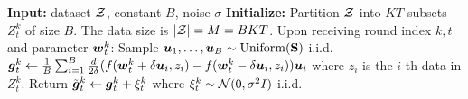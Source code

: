 \begin{algorithm}[t]
\caption{Naive private gradient oracle}
\label{alg:DP-O2NC:oracle-standard}
\begin{algorithmic}[1]
    \Statex \textbf{Input:} dataset ${\cal Z}$, constant $B$, noise $\sigma$
    \Statex \textbf{Initialize:} Partition ${\cal Z}$ into $KT$ subsets $Z_t^k$ of size $B$. The data size is $|{\cal Z}|=M=BKT$.
    \State Upon receiving round index $k,t$ and parameter ${\boldsymbol{w}}_t^k$:
    \State Sample ${\boldsymbol{u}}_1,\ldots,{\boldsymbol{u}}_B\sim\mathrm{Uniform}({\mathbf{S}})$ i.i.d.
    \State ${\boldsymbol{g}}_t^k \gets \frac{1}{B}\sum_{i=1}^B \frac{d}{2\delta}(f({\boldsymbol{w}}_t^k+\delta{\boldsymbol{u}}_i,z_i) - f({\boldsymbol{w}}_t^k-\delta{\boldsymbol{u}}_i,z_i)){\boldsymbol{u}}_i$ where $z_i$ is the $i$-th data in $Z_t^k$.
    \State Return $\tilde{{\boldsymbol{g}}}_t^k \gets {\boldsymbol{g}}_t^k + \xi_t^k$ where $\xi_t^k \sim {\cal N}(0,\sigma^2I)$ i.i.d.
\end{algorithmic}
\end{algorithm}